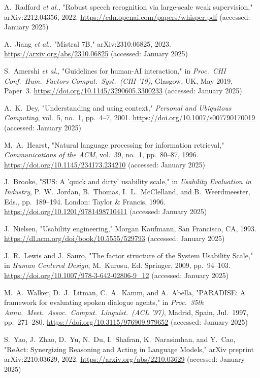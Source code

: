 \documentclass[a4paper,12pt]{article}
\begin{document}
\begin{thebibliography}{28}
 A.~Radford \textit{et al.}, "Robust speech recognition via large-scale weak supervision," arXiv:2212.04356, 2022. \url{https://cdn.openai.com/papers/whisper.pdf} (accessed: January 2025)

 A.~Jiang \textit{et al.}, "Mistral 7B," arXiv:2310.06825, 2023. \url{https://arxiv.org/abs/2310.06825} (accessed: January 2025)

 S.~Amershi \textit{et al.}, "Guidelines for human-AI interaction," in \textit{Proc.~CHI Conf.~Hum.~Factors Comput.~Syst.~(CHI '19)}, Glasgow, UK, May 2019, Paper~3. \url{https://doi.org/10.1145/3290605.3300233} (accessed: January 2025)

 A.~K.~Dey, "Understanding and using context," \textit{Personal and Ubiquitous Computing}, vol.~5, no.~1, pp.~4--7, 2001. \url{https://doi.org/10.1007/s007790170019} (accessed: January 2025)

 M.~A.~Hearst, "Natural language processing for information retrieval," \textit{Communications of the ACM}, vol.~39, no.~1, pp.~80--87, 1996. \url{https://doi.org/10.1145/234173.234210} (accessed: January 2025)

 J.~Brooke, "SUS: A 'quick and dirty' usability scale," in \textit{Usability Evaluation in Industry}, P.~W.~Jordan, B.~Thomas, I.~L.~McClelland, and B.~Weerdmeester, Eds., pp.~189--194. London: Taylor \& Francis, 1996. \url{https://doi.org/10.1201/9781498710411} (accessed: January 2025)

 J.~Nielsen, "Usability engineering," Morgan Kaufmann, San Francisco, CA, 1993. \url{https://dl.acm.org/doi/book/10.5555/529793} (accessed: January 2025)

 J.~R.~Lewis and J.~Sauro, "The factor structure of the System Usability Scale," in \textit{Human Centered Design}, M.~Kurosu, Ed. Springer, 2009, pp.~94--103. \url{https://doi.org/10.1007/978-3-642-02806-9_12} (accessed: January 2025)

 M.~A.~Walker, D.~J.~Litman, C.~A.~Kamm, and A.~Abella, "PARADISE: A framework for evaluating spoken dialogue agents," in \textit{Proc.~35th Annu.~Meet.~Assoc.~Comput.~Linguist.~(ACL '97)}, Madrid, Spain, Jul.~1997, pp.~271--280. \url{https://doi.org/10.3115/976909.979652} (accessed: January 2025)

 S.~Yao, J.~Zhao, D.~Yu, N.~Du, I.~Shafran, K.~Narasimhan, and Y.~Cao, "ReAct: Synergizing Reasoning and Acting in Language Models," arXiv preprint arXiv:2210.03629, 2022. \url{https://arxiv.org/abs/2210.03629} (accessed: January 2025)


\end{thebibliography}
\end{document}
